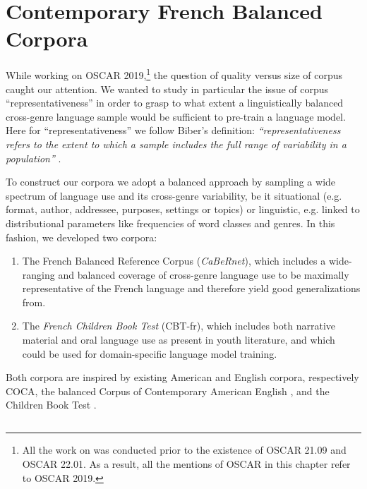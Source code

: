 \section{Contemporary French Balanced Corpora}
\label{sec:DescribeCorpora}

While working on OSCAR 2019,\footnote{All the work on \Cabernet was conducted prior to the existence of OSCAR 21.09 and OSCAR 22.01. As a result, all the mentions of OSCAR in this chapter refer to OSCAR 2019.} the question of quality versus size of corpus caught our attention. We wanted to study in particular the issue of corpus ``representativeness'' in order to grasp to what extent a linguistically balanced cross-genre language sample would be sufficient to pre-train a language model. Here for ``representativeness'' we follow Biber's definition: \emph{“representativeness refers to the extent to which a sample includes the full range of variability in a population”} \citep{biber-1993-representativeness}.

To construct our corpora we adopt a balanced approach by sampling a wide spectrum of language use and its cross-genre variability, be it situational (e.g. format, author, addressee, purposes, settings or topics) or linguistic, e.g. linked to distributional parameters like frequencies of word classes and genres. In this fashion, we developed two corpora:
\begin{enumerate}
    \item The French Balanced Reference Corpus (\emph{CaBeRnet}), which includes a wide-ranging and balanced coverage of cross-genre language use to be maximally representative of the French language and therefore yield good generalizations from.
    \item The \emph{French Children Book Test} (CBT-fr), which includes both narrative material and oral language use as present in youth literature, and which could be used for domain-specific language model training.
\end{enumerate}

Both corpora are inspired by existing American and English corpora, respectively  COCA, the balanced Corpus of Contemporary American English \citep{davies-2009-the, davies-2010-the}, and the Children Book Test \citep[CBT]{hill-etal-2016-the}.

\subsection{\Cabernet} \label{subsec:DescribeCaBeRnet}

